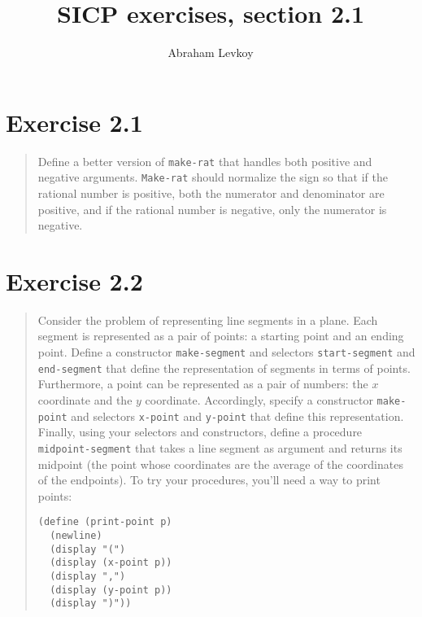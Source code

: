 \documentclass{article}
\author{Abraham Levkoy}
\title{SICP exercises, section 2.1}
\begin{document}
\maketitle

\section{Exercise 2.1}
\begin{quote}
    Define a better version of \texttt{make-rat} that handles both positive and
    negative arguments. \texttt{Make-rat} should normalize the sign so that if
    the rational number is positive, both the numerator and denominator are
    positive, and if the rational number is negative, only the numerator is
    negative.
\end{quote}



\section{Exercise 2.2}
\begin{quote}
    Consider the problem of representing line segments in a plane. Each segment
    is represented as a pair of points: a starting point and an ending point.
    Define a constructor \texttt{make-segment} and selectors
    \texttt{start-segment} and \texttt{end-segment} that define the
    representation of segments in terms of points.  Furthermore, a point can be
    represented as a pair of numbers: the $x$ coordinate and the $y$
    coordinate. Accordingly, specify a constructor \texttt{make-point} and
    selectors \texttt{x-point} and \texttt{y-point} that define this
    representation. Finally, using your selectors and constructors, define a
    procedure \texttt{midpoint-segment} that takes a line segment as argument
    and returns its midpoint (the point whose coordinates are the average of
    the coordinates of the endpoints). To try your procedures, you’ll need a
    way to print points:
    \begin{lstlisting}
(define (print-point p)
  (newline)
  (display "(")
  (display (x-point p))
  (display ",")
  (display (y-point p))
  (display ")"))
    \end{lstlisting}
\end{quote}


\end{document}
